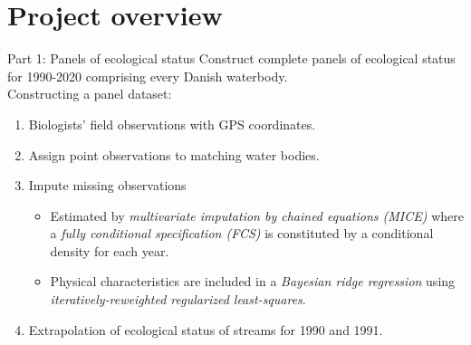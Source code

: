 \section{Project overview}

\begin{frame}{Part 1: Panels of ecological status}
  Construct complete panels of ecological status for 1990-2020 comprising every Danish waterbody.\\\bigskip
  Constructing a panel dataset:
  \begin{enumerate}
    \item Biologists' field observations with GPS coordinates.
    \item Assign point observations to matching water bodies.
    \item Impute missing observations
    \begin{itemize}
      \item Estimated by \textit{multivariate imputation by chained equations (MICE)} where a \textit{fully conditional specification (FCS)} is constituted by a conditional density for each year.
      \item Physical characteristics are included in a \textit{Bayesian ridge regression} using \textit{iteratively-reweighted regularized least-squares}.
    \end{itemize}
    \item Extrapolation of ecological status of streams for 1990 and 1991.
  \end{enumerate}
\end{frame}
